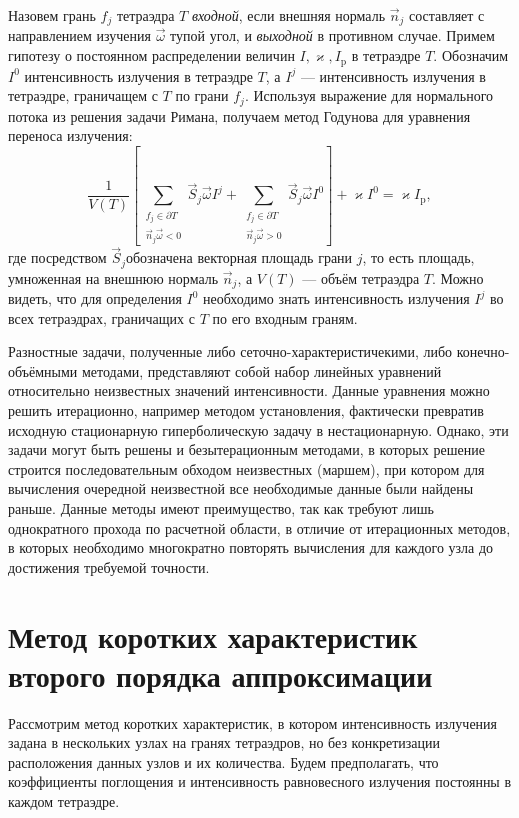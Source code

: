 Назовем грань $f_j$ тетраэдра $T$ \emph{входной}, если внешняя нормаль $\vec n_j$ составляет с направлением изучения $\vec \omega$ тупой угол, и \emph{выходной} в противном случае.
Примем гипотезу о постоянном распределении величин $I, \varkappa, I_{\text{p}}$ в тетраэдре $T$. Обозначим $I^0$ интенсивность излучения в тетраэдре $T$, а $I^j$ --- интенсивность излучения в тетраэдре, граничащем с $T$ по грани $f_j$. Используя выражение для нормального потока из решения задачи Римана, получаем метод Годунова для уравнения переноса излучения:
\begin{equation}
\frac{1}{V(T)}\left[
\sum_{\substack{f_j \in \partial T\\\vec n_j \vec \omega < 0}} \vec S_j \vec \omega I^j 
+
\sum_{\substack{f_j \in \partial T\\\vec n_j \vec \omega > 0}} \vec S_j \vec \omega I^0
\right]
+ \varkappa I^0 = \varkappa I_\text{p},
\label{eq:fvm}
\end{equation}
где посредством $\vec S_j$обозначена векторная площадь грани $j$, то есть площадь, умноженная на внешнюю нормаль $\vec n_j$, а $V(T)$ --- объём тетраэдра $T$. Можно видеть, что для определения $I^0$ необходимо знать интенсивность излучения $I^j$ во всех тетраэдрах, граничащих с $T$ по его входным граням.

Разностные задачи, полученные либо сеточно-характеристичекими, либо конечно-объёмными методами, представляют собой набор линейных уравнений относительно неизвестных значений интенсивности. Данные уравнения можно решить итерационно, например методом установления, фактически превратив исходную стационарную гиперболическую задачу в нестационарную. Однако, эти задачи могут быть решены и безытерационным методами, в которых решение строится последовательным обходом неизвестных (маршем), при котором для вычисления очередной неизвестной все необходимые данные были найдены раньше.
Данные методы имеют преимущество, так как требуют лишь однократного прохода по расчетной области, в отличие от итерационных методов, в которых необходимо многократно повторять вычисления для каждого узла до достижения требуемой точности.

\section{Метод коротких характеристик второго порядка аппроксимации}

Рассмотрим метод коротких характеристик, в котором интенсивность излучения задана в нескольких узлах на гранях тетраэдров, но без конкретизации расположения данных узлов и их количества. Будем предполагать, что коэффициенты поглощения и интенсивность равновесного излучения постоянны в каждом тетраэдре.

